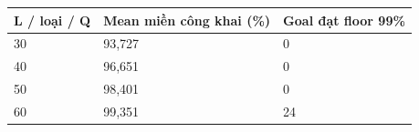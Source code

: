 \par\smallskip\noindent\begin{tabularx}{\linewidth}{@{}XXX@{}}\toprule
\textbf{L / loại / Q} & \textbf{Mean miền công khai (\%)} & \textbf{Goal đạt floor 99\%} \\
\midrule
30 & 93{,}727 & 0 \\
40 & 96{,}651 & 0 \\
50 & 98{,}401 & 0 \\
60 & 99{,}351 & 24 \\
\bottomrule\end{tabularx}\par\smallskip
